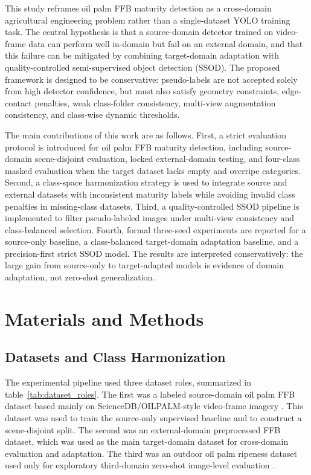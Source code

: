 ﻿\documentclass[12pt]{article}
\begin{document}
This study reframes oil palm FFB maturity detection as a cross-domain agricultural engineering problem rather than a single-dataset YOLO training task. The central hypothesis is that a source-domain detector trained on video-frame data can perform well in-domain but fail on an external domain, and that this failure can be mitigated by combining target-domain adaptation with quality-controlled semi-supervised object detection (SSOD). The proposed framework is designed to be conservative: pseudo-labels are not accepted solely from high detector confidence, but must also satisfy geometry constraints, edge-contact penalties, weak class-folder consistency, multi-view augmentation consistency, and class-wise dynamic thresholds.

The main contributions of this work are as follows. First, a strict evaluation protocol is introduced for oil palm FFB maturity detection, including source-domain scene-disjoint evaluation, locked external-domain testing, and four-class masked evaluation when the target dataset lacks empty and overripe categories. Second, a class-space harmonization strategy is used to integrate source and external datasets with inconsistent maturity labels while avoiding invalid class penalties in missing-class datasets. Third, a quality-controlled SSOD pipeline is implemented to filter pseudo-labeled images under multi-view consistency and class-balanced selection. Fourth, formal three-seed experiments are reported for a source-only baseline, a class-balanced target-domain adaptation baseline, and a precision-first strict SSOD model. The results are interpreted conservatively: the large gain from source-only to target-adapted models is evidence of domain adaptation, not zero-shot generalization.

\section{Materials and Methods}

\subsection{Datasets and Class Harmonization}

The experimental pipeline used three dataset roles, summarized in table~\ref{tab:dataset_roles}. The first was a labeled source-domain oil palm FFB dataset based mainly on ScienceDB/OILPALM-style video-frame imagery \citep{suharjito2023dataset}. This dataset was used to train the source-only supervised baseline and to construct a scene-disjoint split. The second was an external-domain preprocessed FFB dataset, which was used as the main target-domain dataset for cross-domain evaluation and adaptation. The third was an outdoor oil palm ripeness dataset used only for exploratory third-domain zero-shot image-level evaluation \citep{omar2024outdoor}.
\end{document}
